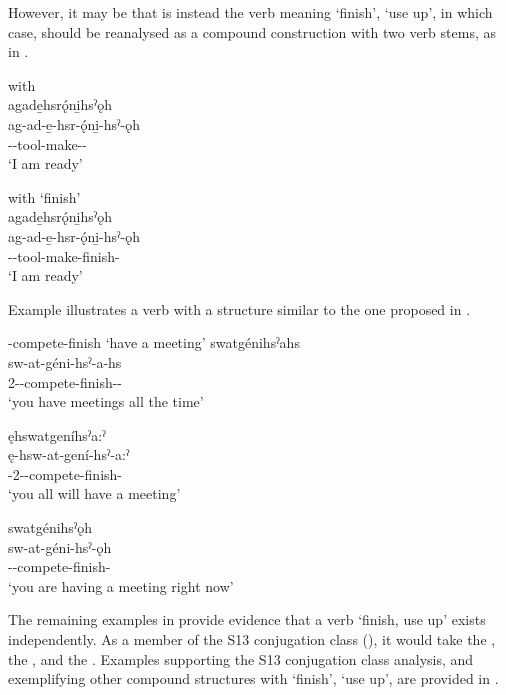 However, it may be that  is instead the verb meaning ‘finish’, ‘use up’, in which case,  should be reanalysed as a compound construction with two verb stems, as in .

\ea\label{ex:eventuative1} 
\ea with {\eventuative}\\
agade̱hsrǫ́ni̱hsˀǫh\\\label{ex:eventuative1a}
\gll ag-ad-e̱-hsr-ǫ́ni̱-hsˀ-ǫh\\
 -{\joinerE}-tool-make-\exsc{\eventuative}-{\stative} \\
\glt `I am ready'

\ex with  ‘finish’\\
agade̱hsrǫ́ni̱hsˀǫh\\\label{ex:eventuative1b}
\gll ag-ad-e̱-hsr-ǫ́ni̱-hsˀ-ǫh\\
 -{\joinerE}-tool-make-finish-{\stative} \\
\glt `I am ready'
\z
\z

Example  illustrates a verb with a structure similar to the one proposed in .

\ea\label{ex:eventuative6}  \textsc{\semireflexive-}compete-finish ‘have a meeting’
\ea swatgénihsˀahs\\\label{ex:eventuative6a}
\gll sw-at-géni-hsˀ-a-hs\\
 {2\pla}-{\semireflexive}-compete-finish-{\joinerA}-{\habitual}\\
\glt `you have meetings all the time'

\ex ęhswatgeníhsˀa:ˀ\\\label{ex:eventuative6b}
\gll ę-hsw-at-gení-hsˀ-a:ˀ\\
 \fut-{2\pla}-{\semireflexive}-compete-finish-{\punctual}\\
\glt `you all will have a meeting'

\ex swatgénihsˀǫh\\\label{ex:eventuative6c}
\gll sw-at-géni-hsˀ-ǫh\\
 -{\semireflexive}-compete-finish-{\stative}\\
\glt `you are having a meeting right now'
\z
\z

The remaining examples in  provide evidence that a verb  ‘finish, use up’ exists independently. As a member of the \textsc{S13} conjugation class (), it would take the   {\habitual}, the  {\punctual}, and the  {\stative}. Examples supporting the S13 conjugation class analysis, and exemplifying other compound structures with  ‘finish’, ‘use up’, are provided in .

